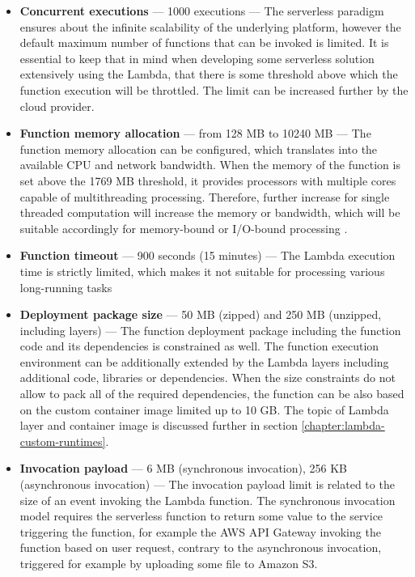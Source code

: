 \begin{itemize}
   \item \textbf{Concurrent executions} --- 1000 executions --- The serverless paradigm ensures about the infinite scalability of the underlying platform, however the default maximum number of functions that can be invoked is limited. It is essential to keep that in mind when developing some serverless solution extensively using the Lambda, that there is some threshold above which the function execution will be throttled. The limit can be increased further by the cloud provider.
   \item \textbf{Function memory allocation} --- from 128 MB to 10240 MB --- The function memory allocation can be configured, which translates into the available CPU and network bandwidth. When the memory of the function is set above the 1769 MB threshold, it provides processors with multiple cores capable of multithreading processing. Therefore, further increase for single threaded computation will increase the memory or bandwidth, which will be suitable accordingly for memory-bound or I/O-bound processing \cite{BecomeAServerlessBlackBelt}.
   \item \textbf{Function timeout} --- 900 seconds (15 minutes) --- The Lambda execution time is strictly limited, which makes it not suitable for processing various long-running tasks
   \item \textbf{Deployment package size} --- 50 MB (zipped) and 250 MB (unzipped, including layers) --- The function deployment package including the function code and its dependencies is constrained as well. The function execution environment can be additionally extended by the Lambda layers including additional code, libraries or dependencies. When the size constraints do not allow to pack all of the required dependencies, the function can be also based on the custom container image limited up to 10 GB. The topic of Lambda layer and container image is discussed further in section \ref{chapter:lambda-custom-runtimes}.
   \item \textbf{Invocation payload} --- 6 MB (synchronous invocation), 256 KB (asynchronous invocation) --- The invocation payload limit is related to the size of an event invoking the Lambda function.
   The synchronous invocation model requires the serverless function to return some value to the service triggering the function, for example the AWS API Gateway invoking the function based on user request, contrary to the asynchronous invocation, triggered for example by uploading some file to Amazon S3.

\end{itemize}
